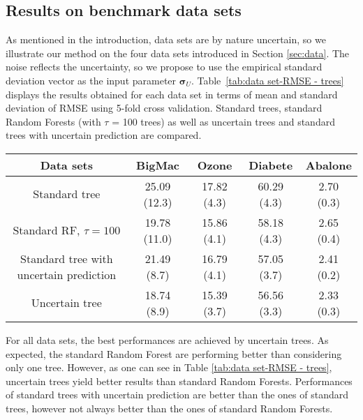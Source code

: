 \subsection{Results on benchmark data sets}
\label{sec:bench}
As mentioned in the introduction, data sets are by nature uncertain, so we illustrate our method on the four data sets introduced in Section \ref{sec:data}. 
The noise reflects the uncertainty, so we propose to use the empirical standard deviation vector as the input parameter $\boldsymbol{\sigma}_U$. Table~\ref{tab:data set-RMSE - trees} displays the results obtained for each data set in terms of mean and standard deviation of RMSE using 5-fold cross validation.
Standard trees, standard Random Forests (with $\tau$ = 100 trees) as well as uncertain trees and standard trees with uncertain prediction are compared.

\begin{table*}[ht!]
  \centering
      \begin{tabular}{ccccc}
         Data sets & {BigMac}& {Ozone} & {Diabete}   & {Abalone}  \\
        \hline
        \hline
         Standard tree  & 25.09 (12.3) & 17.82 (4.3) & 60.29 (4.3) & 2.70 (0.3) \\
         Standard RF, $\tau = 100$ & 19.78 (11.0) & 15.86 (4.1) & 58.18 (4.3) & 2.65 (0.4) \\
        Standard tree with uncertain prediction  & 21.49 (8.7) & 16.79 (4.1) & 57.05 (3.7)&  2.41 (0.2) \\
        Uncertain tree & 18.74 (8.9) & 15.39 (3.7) & 56.56 (3.3) &  2.33 (0.3)  \\
        \hline
      \end{tabular}
\caption{Average RMSE based on 5-fold cross-validation for the 4 benchmark data sets. Standard deviations are given in parentheses. For each  uncertain tree based method, $\boldsymbol{\sigma}_{U}$ are set to the empirical standard deviations of the observed input variables.}
\label{tab:data set-RMSE - trees}
\end{table*}

For all data sets, the best performances are achieved by uncertain trees.
As expected, the standard Random Forest are performing better than considering only one tree. However, as one can see in Table \ref{tab:data set-RMSE - trees}, uncertain trees yield better results than standard Random Forests. Performances of standard trees with uncertain prediction are better than the ones of standard trees, however not always better than the ones of standard Random Forests.

